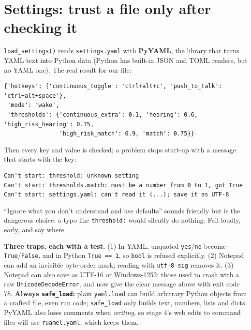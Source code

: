 \documentclass[11pt,a4paper]{article}
\begin{document}
\section{Settings: trust a file only after checking it}
\texttt{load\_settings()} reads \texttt{settings.yaml} with \textbf{PyYAML}, the library that turns
YAML text into Python data (Python has built-in JSON and TOML readers, but no YAML one). The real
result for our file:
\begin{lstlisting}
{'hotkeys': {'continuous_toggle': 'ctrl+alt+c', 'push_to_talk': 'ctrl+alt+space'},
 'mode': 'wake',
 'thresholds': {'continuous_extra': 0.1, 'hearing': 0.6, 'high_risk_hearing': 0.75,
                'high_risk_match': 0.9, 'match': 0.75}}
\end{lstlisting}
\noindent Then every key and value is checked; a problem stops start-up with a message that starts
with the key:
\begin{lstlisting}
Can't start: threshold: unknown setting
Can't start: thresholds.match: must be a number from 0 to 1, got True
Can't start: settings.yaml: can't read it (...); save it as UTF-8
\end{lstlisting}

\begin{why}
``Ignore what you don't understand and use defaults'' sounds friendly but is the dangerous choice:
a typo like \texttt{threshold:} would silently do nothing. Fail loudly, early, and say where.
\end{why}

\begin{caution}
\textbf{Three traps, each with a test.} (1) In YAML, unquoted \texttt{yes}/\texttt{no} become
\texttt{True}/\texttt{False}, and in Python \texttt{True == 1}, so \texttt{bool} is refused
explicitly. (2) Notepad can add an invisible byte-order mark; reading with
\texttt{utf-8-sig} removes it. (3) Notepad can also save as UTF-16 or Windows-1252; those used to
crash with a raw \texttt{UnicodeDecodeError}, and now give the clear message above with exit
code 78. \textbf{Always \texttt{safe\_load}:} plain \texttt{yaml.load} can build arbitrary Python
objects from a crafted file, even run code; \texttt{safe\_load} only builds text, numbers, lists
and dicts. PyYAML also loses comments when \emph{writing}, so stage 4's web edits to command files
will use \texttt{ruamel.yaml}, which keeps them.
\end{caution}

\end{document}
